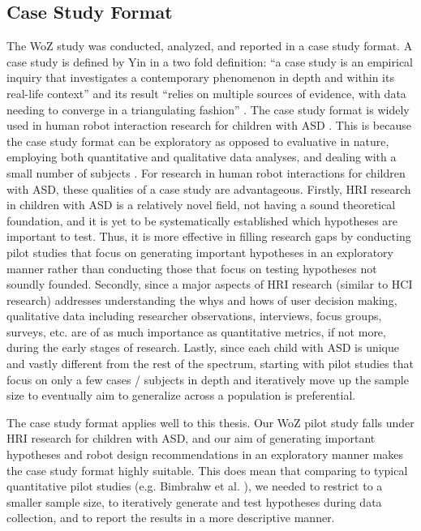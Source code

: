 \subsection{Case Study Format}
The WoZ study was conducted, analyzed, and reported in a case study format.  A case study is defined by Yin in a two fold definition: ``a case study is an empirical inquiry that investigates a contemporary phenomenon in depth and within its real-life context'' and its result ``relies on multiple sources of evidence, with data needing to converge in a triangulating fashion'' \cite{yin2013case}.  The case study format is widely used in human robot interaction research for children with ASD \cite{kozima2005interactive, robins2004robot, robins2009isolation}.  This is because the case study format can be exploratory as opposed to evaluative in nature, employing both quantitative and qualitative data analyses, and dealing with a small number of subjects \cite{yin2013case}.  For research in human robot interactions for children with ASD, these qualities of a case study are advantageous.  Firstly, HRI research in children with ASD is a relatively novel field, not having a sound theoretical foundation, and it is yet to be systematically established which hypotheses are important to test.  Thus, it is more effective in filling research gaps by conducting pilot studies that focus on generating important hypotheses in an exploratory manner rather than conducting those that focus on testing hypotheses not soundly founded.  Secondly, since a major aspects of HRI research (similar to HCI research) addresses understanding the whys and hows of user decision making, qualitative data including researcher observations, interviews, focus groups, surveys, etc. are of as much importance as quantitative metrics, if not more, during the early stages of research.  Lastly, since each child with ASD is unique and vastly different from the rest of the spectrum, starting with pilot studies that focus on only a few cases / subjects in depth and iteratively move up the sample size to eventually aim to generalize across a population is preferential.

The case study format applies well to this thesis.  Our WoZ pilot study falls under HRI research for children with ASD, and our aim of generating important hypotheses and robot design recommendations in an exploratory manner makes the case study format highly suitable.  This does mean that comparing to typical quantitative pilot studies (e.g. Bimbrahw et al. \cite{bimbrahw2012investigating}), we needed to restrict to a smaller sample size, to iteratively generate and test hypotheses during data collection, and to report the results in a more descriptive manner.

